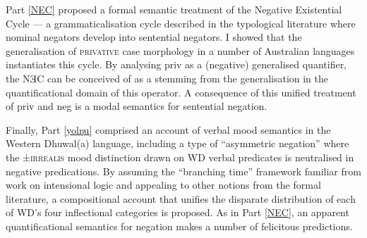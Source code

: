 \documentclass[12pt,dvipsnames]{report}
\begin{document}
Part \ref{NEC} proposed a formal semantic treatment of the Negative Existential Cycle --- a grammaticalisation cycle described in the typological literature where nominal negators develop into sentential negators. I showed that the generalisation of \textsc{privative} case morphology in a number of Australian languages instantiates this cycle. By analysing \gls{priv} as a (negative) generalised quantifier, the NƎC can be conceived of as a stemming from the generalisation in the quantificational domain of this operator. A consequence of this unified treatment of \gls{priv} and \gls{neg} is a modal semantics for sentential negation.

Finally, Part \ref{yolŋu} comprised an account of verbal mood semantics in the Western Dhuwal(a) language, including a type of ``asymmetric negation'' where the ±\textsc{irrealis} mood distinction drawn on WD verbal predicates is neutralised in negative predications. By assuming the ``branching time'' framework familiar from work on intensional logic and appealing to other notions from the formal literature, a compositional account that unifies the disparate distribution of each of WD's four inflectional categories is proposed. As in Part \ref{NEC}, an apparent quantificational semantics for negation makes a number of felicitous predictions.
\end{document}
